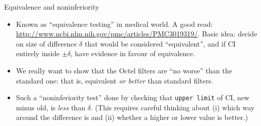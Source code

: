 \documentclass[unknownkeysallowed]{beamer}\usepackage[]{graphicx}\usepackage[]{color}
\makeatletter
\newcommand{\hlstr}[1]{\textcolor[rgb]{0.192,0.494,0.8}{#1}}%
\newcommand{\hlopt}[1]{\textcolor[rgb]{0,0,0}{#1}}%
\newcommand{\hlstd}[1]{\textcolor[rgb]{0.345,0.345,0.345}{#1}}%
\newcommand{\hlkwc}[1]{\textcolor[rgb]{0.333,0.667,0.333}{#1}}%
\newcommand{\hlkwd}[1]{\textcolor[rgb]{0.737,0.353,0.396}{\textbf{#1}}}%
\newenvironment{kframe}{%
 \def\at@end@of@kframe{}%
 \ifinner\ifhmode%
  \def\at@end@of@kframe{\end{minipage}}%
  \begin{minipage}{\columnwidth}%
 \fi\fi%
 \def\FrameCommand##1{\hskip\@totalleftmargin \hskip-\fboxsep
 \colorbox{shadecolor}{##1}\hskip-\fboxsep
     \hskip-\linewidth \hskip-\@totalleftmargin \hskip\columnwidth}%
 \MakeFramed {\advance\hsize-\width
   \@totalleftmargin\z@ \linewidth\hsize
   \@setminipage}}%
 {\par\unskip\endMakeFramed%
 \at@end@of@kframe}
\newenvironment{knitrout}{}{} %
\makeatother
\begin{document}
\begin{frame}[fragile]{Equivalence and noninferiority}
  
  \begin{itemize}
  \item Known as ``equivalence testing'' in medical world. A good
    read:
    \url{http://www.ncbi.nlm.nih.gov/pmc/articles/PMC3019319/}. Basic
    idea: decide on size of difference $\delta$ that would be considered
    ``equivalent'', and if CI entirely inside $\pm \delta$, have
    evidence in favour of equivalence.
  \item We really want to show that the Octel filters are ``no worse''
    than the standard one: that is, equivalent \emph{or better} than
    standard filters.
  \item Such a ``noninferiority test'' done by checking that
    \texttt{upper limit} of CI, new minus old, is \emph{less} than
    $\delta$. (This requires careful thinking about (i) which way
    around the difference is and (ii) whether a higher or lower value
    is better.)
  \end{itemize}
  
\end{frame}


 
  
\end{document}
